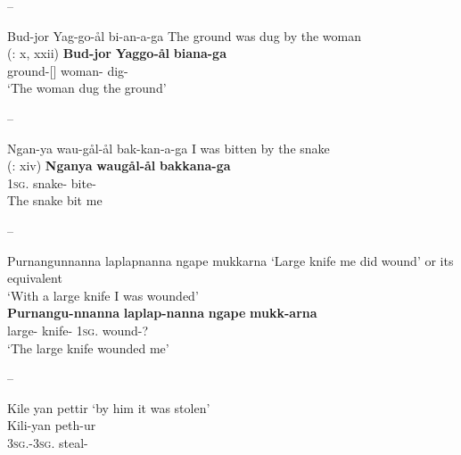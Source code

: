 \documentclass{langscibook}
\begin{document}
\begin{xlist}
\begin{xlist}
\begin{xlist}
--
\ea \label{ex:key:50}
\begin{xlist}
	\ex Bud-jor Yag-go-ål   bi-an-a-ga
	\glt The ground was dug by the woman \\
	(\citealt{symmons_grammatical_1841}: x, xxii)
	\ex 
	\gll \textbf{Bud-jor}          \textbf{Yaggo-ål}      \textbf{biana-ga}\\
	ground-[]    woman-   dig-\\
	\glt `The woman dug the ground'
\end{xlist}
\z
--
\ea\label{ex:key:51}
\begin{xlist}
	\ex Ngan-ya   wau-gål-ål   bak-kan-a-ga
	\glt I was bitten by the snake \\
	(\citealt{symmons_grammatical_1841}: xiv)
	\ex 
	\gll \textbf{Nganya}   \textbf{waugål-ål}           \textbf{bakkana-ga}\\
	1\textsc{sg}.  snake-         bite-\\
	\glt The snake bit me
\end{xlist}
\z
--
\ea\label{ex:key:52}
\begin{xlist}
	\ex Purnangunnanna laplapnanna ngape mukkarna
	\glt ‘Large knife me did wound’ or its equivalent \\ `With a large knife I was wounded' \\
	\citep[24]{moorhouse_report_1841}
	\ex
	\gll \textbf{Purnangu-nnanna} \textbf{laplap-nanna} \textbf{ngape} \textbf{mukk-arna}\\
	large- knife-  1\textsc{sg}. wound-?\\
	\glt `The large knife wounded me'
\end{xlist}
\z
--
\ea\label{ex:key:53}
\begin{xlist}
	\ex Kile    yan          pettir
	\glt `by him it was stolen' \\
	\citep[88]{taplin_notes_1872}
	\ex
	\gll Kili-yan             peth-ur\\
	3\textsc{sg}.-3\textsc{sg}.       steal-\\
\end{xlist}
\z


\end{xlist}
\end{xlist}
\end{xlist}
\end{document}

